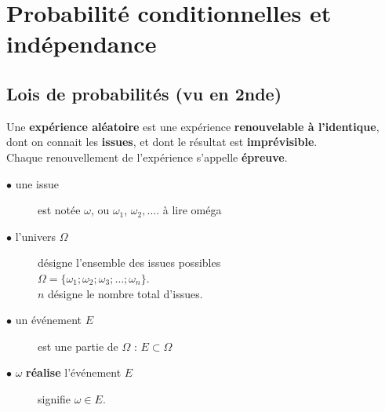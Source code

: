 \documentclass[main.tex]{subfiles}
\begin{document}
 
\cleardoublepage 
{}  
\pagestyle{scrheadings} %
\onehalfspacing 
\setcounter{chapter}{1}
\chapter{Probabilité conditionnelles et indépendance}
\section{Lois de probabilités (vu en 2nde)}
Une \textbf{expérience aléatoire}  est une expérience \textbf{renouvelable à l'identique}, dont on connait les \textbf{issues}, et dont le résultat est \textbf{imprévisible}.\\
Chaque renouvellement de l'expérience s'appelle \textbf{épreuve}.
\begin{description}
	\item[$\bullet$ une issue] est notée  $\omega$, ou $\omega_1$, $\omega_2, \ldots$. à lire \og oméga \fg{}
	\item[$\bullet$ l'univers $\Omega$] désigne l'ensemble des issues possibles\\
$\Omega=\{ \omega_1; \omega_2; \omega_3;\ldots ;\omega_n\}$. \\
$n$ désigne le nombre total d'issues.
	\item[$\bullet$ un événement $E$] est une partie de $\Omega$ : $E\subset \Omega$
	\item[$\bullet$  $\omega$ \textbf{réalise} l'événement $E$]  signifie $\omega\in E$. 
\end{description} 
\end{document}
